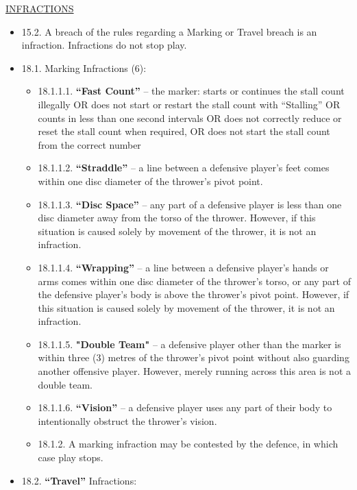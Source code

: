 \begin{center}\underline{\uppercase{infractions}}\end{center}

    \begin{itemize}[noitemsep]
    \tiny
    \item 15.2. A breach of the rules regarding a Marking or Travel breach is an infraction. Infractions do not stop play.
    \item 18.1. Marking Infractions (6):
        \begin{itemize}
            \item 18.1.1.1. \textbf{“Fast Count”} – the marker: starts or continues the stall count illegally OR does not start or restart the stall count with “Stalling” OR counts in less than one second intervals OR does not correctly reduce or reset the stall count when required, OR does not start the stall count from the correct number
            \item 18.1.1.2. \textbf{“Straddle”} – a line between a defensive player’s feet comes within one disc diameter of the thrower’s pivot point.
                \item 18.1.1.3. \textbf{“Disc Space”} – any part of a defensive player is less than one disc diameter away from the torso of the thrower. However, if this situation is caused solely by movement of the thrower, it is not an infraction.
                \item 18.1.1.4. \textbf{“Wrapping”} – a line between a defensive player’s hands or arms comes within one disc diameter of the thrower’s torso, or any part of the defensive player’s body is above the thrower’s pivot point. However, if this situation is caused solely by movement of the thrower, it is not an infraction.
                \item 18.1.1.5. \textbf{"Double Team"} – a defensive player other than the marker is within three (3) metres of the thrower's pivot point without also guarding another offensive player. However, merely running across this area is not a double team.
                \item 18.1.1.6. \textbf{“Vision”} – a defensive player uses any part of their body to intentionally obstruct the thrower’s vision.
                \item 18.1.2. A marking infraction may be contested by the defence, in which case play stops.
        \end{itemize}
    \item 18.2. \textbf{“Travel”} Infractions:

\end{itemize}

